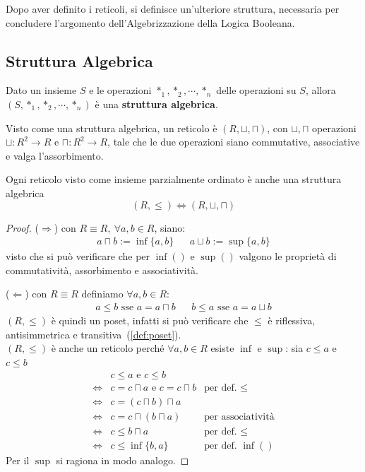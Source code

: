 \noindent 
Dopo aver definito i reticoli, si definisce un'ulteriore struttura, necessaria per concludere l'argomento dell'Algebrizzazione della Logica Booleana. 

\subsection{Struttura Algebrica}
\begin{defi}
Dato un insieme $S$ e le operazioni $*_1, *_2, \cdots, *_n$ delle operazioni su $S$, allora $(S, *_1, *_2, \cdots, *_n)$ è una \textbf{struttura algebrica}.
\end{defi} 
\begin{defi}
  Visto come una struttura algebrica, un reticolo è $(R, \sqcup, \sqcap)$, con $\sqcup, \sqcap$ operazioni $\sqcup: R^2 \rightarrow R$ e $ \sqcap: R^2 \rightarrow R$, tale che le due operazioni siano commutative, associative e valga l'assorbimento.
\end{defi}
\begin{lem}
Ogni reticolo visto come insieme parzialmente ordinato è anche una struttura algebrica
$$
(R, \leq) \iff (R, \sqcup, \sqcap)
$$
\end{lem}
\begin{proof}
  ($\Longrightarrow$) con $R\equiv R,\ \forall a,b \in R$, siano:
  \begin{align*}
     a \sqcap b := \inf \{a,b\} && a \sqcup b := \sup \{a,b\}
  \end{align*}
  visto che si può verificare che per $\inf()$ e $\sup()$ valgono le proprietà di commutatività, assorbimento e associatività.
  
  ($\Longleftarrow$) con $R \equiv R$ definiamo $\forall a,b \in R$:
  \begin{align*}
    a \leq b \text{ sse } a = a \sqcap b &&
    b \leq a \text{ sse } a = a \sqcup b
  \end{align*}
  $(R, \leq)$ è quindi un poset, infatti si può verificare che $\leq$ è riflessiva, antisimmetrica e transitiva~(\ref{def:poset}). \\
  $(R, \leq)$ è anche un reticolo perché $\forall a,b \in R$ esiste $\inf$ e $\sup$: sia $c \leq a$ e $ c \leq b$
  \begin{align*}
    & c \leq a \text{ e } c \leq b \\
    \iff & c = c \sqcap a \text{ e } c = c \sqcap b & \text{per def. } \leq \\
    \iff & c = (c \sqcap b) \sqcap a \\
    \iff & c = c \sqcap (b \sqcap a) & \text{per associatività} \\
    \iff & c \leq b \sqcap a & \text{per def. } \leq \\
    \iff & c \leq \inf\{b, a\} & \text{per def. } \inf()
  \end{align*}
  Per il $\sup$ si ragiona in modo analogo. 
\end{proof}


